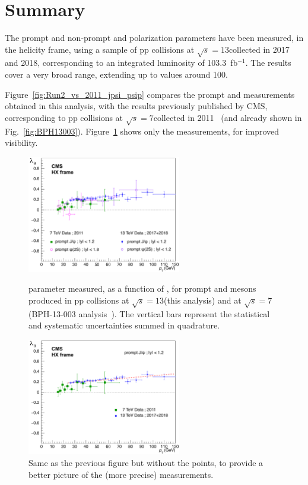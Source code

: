 \section{Summary}
\label{sec:summary}

The prompt and non-prompt \jpsi and \psip \lth polarization parameters have been measured, 
in the helicity frame, 
using a sample of pp collisions at $\sqrt{s} = 13$\TeV collected in 2017 and 2018,
corresponding to an integrated luminosity of 103.3~fb$^{-1}$.
The results cover a very broad \pt range, extending up to \pt values around 100\GeV.

Figure~\ref{fig:Run2_vs_2011_jpsi_psip} compares the prompt \jpsi and \psip \lth measurements
obtained in this analysis,
with the results previously published by CMS, 
corresponding to pp collisions at $\sqrt{s} = 7$\TeV collected in 2011~\cite{bib:BPH-13-003}
(and already shown in Fig.~\ref{fig:BPH13003}).
%
Figure~\ref{fig:Run2_vs_2011_jpsi} shows only the \jpsi measurements,
for improved visibility. 

\begin{figure}[hb]
\centering
\includegraphics[width=0.6\textwidth]{Figures/chapter8/lth_HX-Run2-vs-2011-jpsi-psip.pdf}
\caption{\lth parameter measured, as a function of \pt, 
for prompt \jpsi and \psip mesons produced in pp collisions at $\sqrt{s} = 13$\TeV (this analysis)
and at $\sqrt{s} = 7$\TeV (BPH-13-003 analysis~\cite{bib:BPH-13-003}).
The vertical bars represent the statistical and systematic uncertainties 
summed in quadrature.}
\label{fig:Run2_vs_2011_jpsi_psip}
\centering
\includegraphics[width=0.6\textwidth]{Figures/chapter8/lth_HX-Run2-vs-2011-jpsi.pdf}
\caption{Same as the previous figure but without the \psip points,
to provide a better picture of the (more precise) \jpsi measurements.}
\label{fig:Run2_vs_2011_jpsi}
\end{figure}

